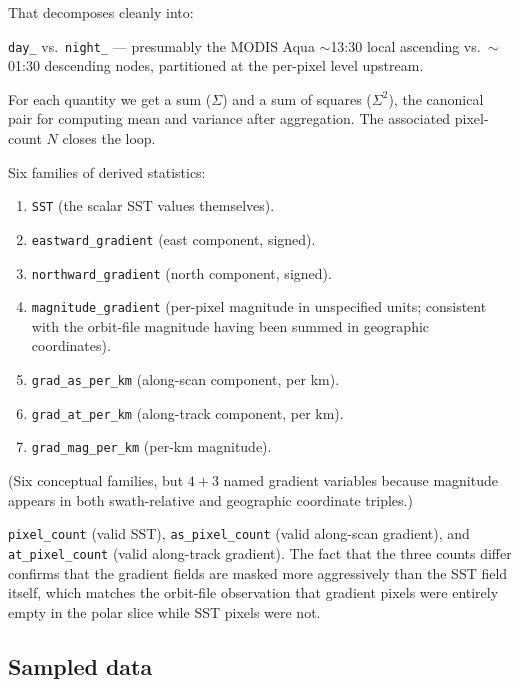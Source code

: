 \documentclass[11pt]{article}
\begin{document}
That decomposes cleanly into:

\begin{description}[leftmargin=2em,topsep=2pt]
  \item[Period partition.] \texttt{day\_} vs.\ \texttt{night\_} ---
    presumably the MODIS Aqua $\sim$13:30 local ascending vs.\
    $\sim$01:30 descending nodes, partitioned at the per-pixel
    level upstream.
  \item[Bookkeeping.] For each quantity we get a sum
    ($\Sigma$) and a sum of squares ($\Sigma^2$), the canonical
    pair for computing mean and variance after aggregation. The
    associated pixel-count $N$ closes the loop.
  \item[Quantity flavors.] Six families of derived statistics:
    \begin{enumerate}
      \item \texttt{SST} (the scalar SST values themselves).
      \item \texttt{eastward\_gradient} (east component, signed).
      \item \texttt{northward\_gradient} (north component, signed).
      \item \texttt{magnitude\_gradient} (per-pixel magnitude in
        unspecified units; consistent with the orbit-file
        magnitude having been summed in geographic coordinates).
      \item \texttt{grad\_as\_per\_km} (along-scan component, per
        km).
      \item \texttt{grad\_at\_per\_km} (along-track component, per
        km).
      \item \texttt{grad\_mag\_per\_km} (per-km magnitude).
    \end{enumerate}
    (Six conceptual families, but $4+3$ named gradient variables
    because magnitude appears in both swath-relative and
    geographic coordinate triples.)
  \item[Three count flavors.] \texttt{pixel\_count} (valid SST),
    \texttt{as\_pixel\_count} (valid along-scan gradient), and
    \texttt{at\_pixel\_count} (valid along-track gradient). The
    fact that the three counts differ confirms that the gradient
    fields are masked more aggressively than the SST field
    itself, which matches the orbit-file observation that gradient
    pixels were entirely empty in the polar slice while SST
    pixels were not.
\end{description}

\subsection{Sampled data}\label{sec:gradients-samples}
\end{document}
